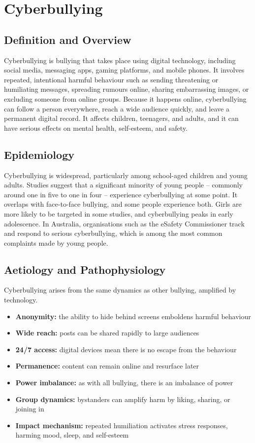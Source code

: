 \chapter{Cyberbullying}

\section*{Definition and Overview}
Cyberbullying is bullying that takes place using digital technology, including social media, messaging apps, gaming platforms, and mobile phones. It involves repeated, intentional harmful behaviour such as sending threatening or humiliating messages, spreading rumours online, sharing embarrassing images, or excluding someone from online groups. Because it happens online, cyberbullying can follow a person everywhere, reach a wide audience quickly, and leave a permanent digital record. It affects children, teenagers, and adults, and it can have serious effects on mental health, self-esteem, and safety.

\section*{Epidemiology}
Cyberbullying is widespread, particularly among school-aged children and young adults. Studies suggest that a significant minority of young people -- commonly around one in five to one in four -- experience cyberbullying at some point. It overlaps with face-to-face bullying, and some people experience both. Girls are more likely to be targeted in some studies, and cyberbullying peaks in early adolescence. In Australia, organisations such as the eSafety Commissioner track and respond to serious cyberbullying, which is among the most common complaints made by young people.

\section*{Aetiology and Pathophysiology}
Cyberbullying arises from the same dynamics as other bullying, amplified by technology.

\begin{itemize}
    \item \textbf{Anonymity:} the ability to hide behind screens emboldens harmful behaviour
    \item \textbf{Wide reach:} posts can be shared rapidly to large audiences
    \item \textbf{24/7 access:} digital devices mean there is no escape from the behaviour
    \item \textbf{Permanence:} content can remain online and resurface later
    \item \textbf{Power imbalance:} as with all bullying, there is an imbalance of power
    \item \textbf{Group dynamics:} bystanders can amplify harm by liking, sharing, or joining in
    \item \textbf{Impact mechanism:} repeated humiliation activates stress responses, harming mood, sleep, and self-esteem
\end{itemize}

